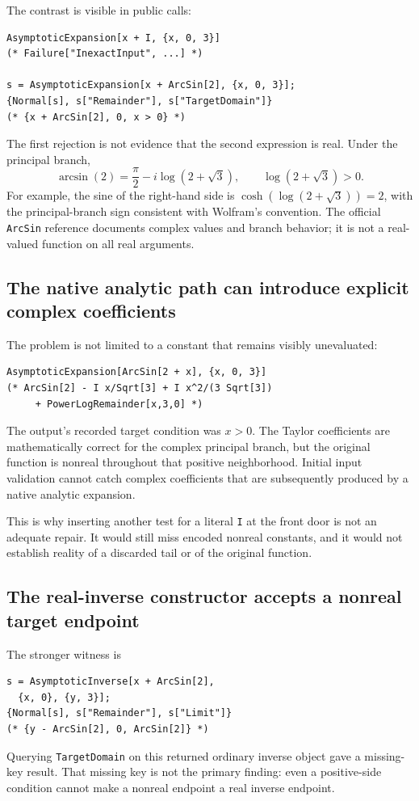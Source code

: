 \documentclass[11pt,letterpaper]{article}
\newcommand{\code}[1]{{\small\nolinkurl{#1}}}
\begin{document}
The contrast is visible in public calls:
\begin{lstlisting}
AsymptoticExpansion[x + I, {x, 0, 3}]
(* Failure["InexactInput", ...] *)

s = AsymptoticExpansion[x + ArcSin[2], {x, 0, 3}];
{Normal[s], s["Remainder"], s["TargetDomain"]}
(* {x + ArcSin[2], 0, x > 0} *)
\end{lstlisting}
The first rejection is not evidence that the second expression is real. Under the principal branch,
\begin{equation}
 \arcsin(2)=\frac\pi2-i\log(2+\sqrt3),\qquad
 \log(2+\sqrt3)>0.
 \label{eq:arcsin}
\end{equation}
For example, the sine of the right-hand side is $\cosh(\log(2+\sqrt3))=2$, with the principal-branch sign consistent with Wolfram's convention. The official \code{ArcSin} reference documents complex values and branch behavior; it is not a real-valued function on all real arguments.\cite{wl-arcsin}

\subsection{The native analytic path can introduce explicit complex coefficients}
The problem is not limited to a constant that remains visibly unevaluated:
\begin{lstlisting}
AsymptoticExpansion[ArcSin[2 + x], {x, 0, 3}]
(* ArcSin[2] - I x/Sqrt[3] + I x^2/(3 Sqrt[3])
     + PowerLogRemainder[x,3,0] *)
\end{lstlisting}
The output's recorded target condition was $x>0$. The Taylor coefficients are mathematically correct for the complex principal branch, but the original function is nonreal throughout that positive neighborhood. Initial input validation cannot catch complex coefficients that are subsequently produced by a native analytic expansion.

This is why inserting another test for a literal \code{I} at the front door is not an adequate repair. It would still miss encoded nonreal constants, and it would not establish reality of a discarded tail or of the original function.

\subsection{The real-inverse constructor accepts a nonreal target endpoint}
The stronger witness is
\begin{lstlisting}
s = AsymptoticInverse[x + ArcSin[2],
  {x, 0}, {y, 3}];
{Normal[s], s["Remainder"], s["Limit"]}
(* {y - ArcSin[2], 0, ArcSin[2]} *)
\end{lstlisting}
Querying \code{TargetDomain} on this returned ordinary inverse object gave a missing-key result. That missing key is not the primary finding: even a positive-side condition cannot make a nonreal endpoint a real inverse endpoint.
\end{document}
